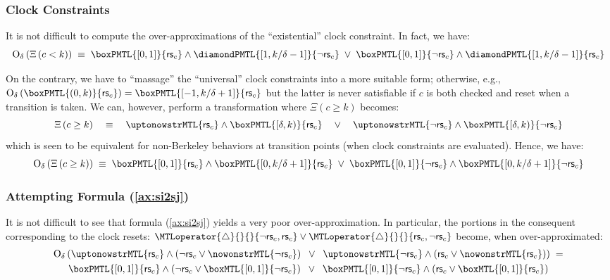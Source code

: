 \documentclass[a4paper]{article}
\newcommand{\frf}[1]{(\ref{#1})}
\newcommand{\overap}[1]{\mathrm{O}_{\delta}\left({#1}\right)}
\newcommand{\rest}[1]{\mathsf{rs}_{#1}}
\newcommand{\becomesMTL}[1]{\MTLoperator{\triangle}{}{}{#1}}
\theoremstyle{plain}
\theoremstyle{definition}
\begin{document}
\subsubsection{Clock Constraints}
It is not difficult to compute the over-ap\-prox\-i\-ma\-tions of the ``existential'' clock constraint.
In fact, we have:
\begin{displaymath}
	 \overap{\Xi\left(c < k\right)}      \;\equiv\;
              \boxPMTL{[0,1]}{\rest{c}} \wedge \diamondPMTL{[1, k/\delta-1]}{\neg \rest{c}}
              \;\vee\; \boxPMTL{[0,1]}{\neg \rest{c}} \wedge \diamondPMTL{[1, k/\delta-1]}{\rest{c}}
\end{displaymath}

On the contrary, we have to ``massage'' the ``universal'' clock constraints into a more suitable form; otherwise, e.g., $\overap{\boxPMTL{(0,k)}{\rest{c}}} =  \boxPMTL{[-1,k/\delta+1]}{\rest{c}}$ but the latter is never satisfiable if $c$ is both checked and reset when a transition is taken.
We can, however, perform a transformation where $\Xi(c \geq k)$ becomes:
\begin{displaymath}
  \Xi\left(c \geq k\right)      \quad\equiv\quad
              \uptonowstrMTL{\rest{c}} \wedge \boxPMTL{[\delta, k)}{\rest{c}}
              \quad\vee\quad  \uptonowstrMTL{\neg \rest{c}} \wedge \boxPMTL{[\delta, k)}{\neg \rest{c}}
\end{displaymath}
which is seen to be equivalent for non-Berkeley behaviors at transition points (when clock constraints are evaluated).
Hence, we have:
\begin{displaymath}
	 \overap{\Xi\left(c \geq k\right)}      \;\equiv\;
              \boxPMTL{[0,1]}{\rest{c}} \wedge \boxPMTL{[0, k/\delta+1]}{\rest{c}}
              \;\vee\;  \boxPMTL{[0,1]}{\neg \rest{c}} \wedge \boxPMTL{[0, k/\delta+1]}{\neg \rest{c}}
\end{displaymath}



\subsubsection{Attempting Formula \frf{ax:si2sj}} \label{sec:attempt}
It is not difficult to see that formula \frf{ax:si2sj} yields a very poor over-ap\-prox\-i\-ma\-tion.
In particular, the portions in the consequent corresponding to the clock resets: $\becomesMTL{\neg \rest{c}, \rest{c}} \vee \becomesMTL{\rest{c}, \neg \rest{c}}$ become, when over-approximated:
\begin{multline}
  \overap{ \uptonowstrMTL{\rest{c}} \wedge (\neg \rest{c} \vee \nowonstrMTL{\neg \rest{c}})
           \;\;\vee\;\;
			  \uptonowstrMTL{\neg \rest{c}} \wedge (\rest{c} \vee \nowonstrMTL{\rest{c}})} \;=\\
         \boxPMTL{[0,1]}{\rest{c}} \wedge (\neg \rest{c} \vee \boxMTL{[0,1]}{\neg \rest{c}})
          \;\;\vee\;\;
			 \boxPMTL{[0,1]}{\neg \rest{c}} \wedge (\rest{c} \vee \boxMTL{[0,1]}{\rest{c}})
\end{multline}
\end{document}

